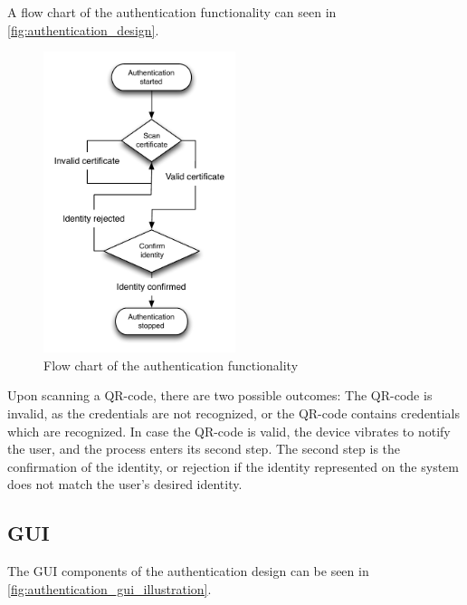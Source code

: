 A flow chart of the authentication functionality can seen in \autoref{fig:authentication_design}.
\begin{figure}[!h]
	\centering
	\includegraphics[width=0.5\textwidth]{gfx/authentication_design.pdf}
	\caption{Flow chart of the authentication functionality}
	\label{fig:authentication_design}
\end{figure}

Upon scanning a QR-code, there are two possible outcomes: The QR-code is invalid, as the credentials are not recognized, or the QR-code contains credentials which are recognized.
In case the QR-code is valid, the device vibrates to notify the user, and the process enters its second step. The second step is the confirmation of the identity, or rejection if the identity represented on the system does not match the user's desired identity.

\subsection{GUI}
The GUI components of the authentication design can be seen in \autoref{fig:authentication_gui_illustration}.

